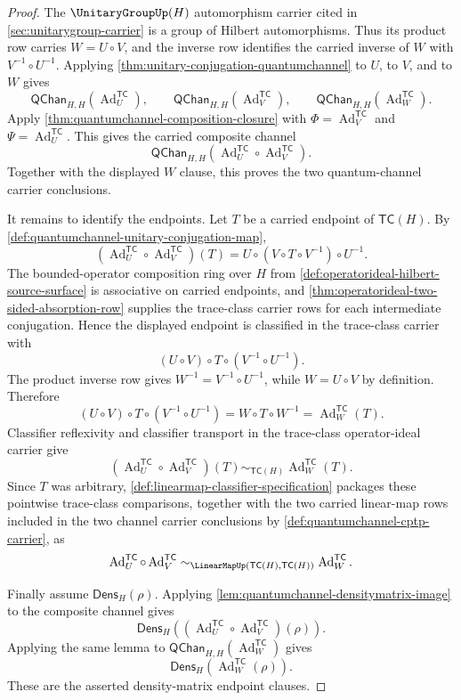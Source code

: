 \begin{proof}
The $\UnitaryGroupUp(H)$ automorphism carrier cited in \autoref{sec:unitarygroup-carrier} is a group of Hilbert automorphisms. Thus its product row carries $W=U\circ V$, and the inverse row identifies the carried inverse of $W$ with $V^{-1}\circ U^{-1}$. Applying \autoref{thm:unitary-conjugation-quantumchannel} to $U$, to $V$, and to $W$ gives
$$
\mathsf{QChan}_{H,H}(\operatorname{Ad}^{\mathsf{TC}}_U),
\qquad
\mathsf{QChan}_{H,H}(\operatorname{Ad}^{\mathsf{TC}}_V),
\qquad
\mathsf{QChan}_{H,H}(\operatorname{Ad}^{\mathsf{TC}}_{W}).
$$
Apply \autoref{thm:quantumchannel-composition-closure} with $\Phi=\operatorname{Ad}^{\mathsf{TC}}_V$ and $\Psi=\operatorname{Ad}^{\mathsf{TC}}_U$. This gives the carried composite channel
$$
\mathsf{QChan}_{H,H}(\operatorname{Ad}^{\mathsf{TC}}_U\circ\operatorname{Ad}^{\mathsf{TC}}_V).
$$
Together with the displayed $W$ clause, this proves the two quantum-channel carrier conclusions.

It remains to identify the endpoints. Let $T$ be a carried endpoint of $\mathsf{TC}(H)$. By \autoref{def:quantumchannel-unitary-conjugation-map},
$$
(\operatorname{Ad}^{\mathsf{TC}}_U\circ\operatorname{Ad}^{\mathsf{TC}}_V)(T)
=
U\circ (V\circ T\circ V^{-1})\circ U^{-1}.
$$
The bounded-operator composition ring over $H$ from \autoref{def:operatorideal-hilbert-source-surface} is associative on carried endpoints, and \autoref{thm:operatorideal-two-sided-absorption-row} supplies the trace-class carrier rows for each intermediate conjugation. Hence the displayed endpoint is classified in the trace-class carrier with
$$
(U\circ V)\circ T\circ (V^{-1}\circ U^{-1}).
$$
The product inverse row gives $W^{-1}=V^{-1}\circ U^{-1}$, while $W=U\circ V$ by definition. Therefore
$$
(U\circ V)\circ T\circ (V^{-1}\circ U^{-1})
=
W\circ T\circ W^{-1}
=
\operatorname{Ad}^{\mathsf{TC}}_{W}(T).
$$
Classifier reflexivity and classifier transport in the trace-class operator-ideal carrier give
$$
(\operatorname{Ad}^{\mathsf{TC}}_U\circ\operatorname{Ad}^{\mathsf{TC}}_V)(T)
\sim_{\mathsf{TC}(H)}
\operatorname{Ad}^{\mathsf{TC}}_{W}(T).
$$
Since $T$ was arbitrary, \autoref{def:linearmap-classifier-specification} packages these pointwise trace-class comparisons, together with the two carried linear-map rows included in the two channel carrier conclusions by \autoref{def:quantumchannel-cptp-carrier}, as
$$
\operatorname{Ad}^{\mathsf{TC}}_U\circ\operatorname{Ad}^{\mathsf{TC}}_V
\sim_{\LinearMapUp(\mathsf{TC}(H),\mathsf{TC}(H))}
\operatorname{Ad}^{\mathsf{TC}}_{W}.
$$

Finally assume $\mathsf{Dens}_H(\rho)$. Applying \autoref{lem:quantumchannel-densitymatrix-image} to the composite channel gives
$$
\mathsf{Dens}_H((\operatorname{Ad}^{\mathsf{TC}}_U\circ\operatorname{Ad}^{\mathsf{TC}}_V)(\rho)).
$$
Applying the same lemma to $\mathsf{QChan}_{H,H}(\operatorname{Ad}^{\mathsf{TC}}_{W})$ gives
$$
\mathsf{Dens}_H(\operatorname{Ad}^{\mathsf{TC}}_{W}(\rho)).
$$
These are the asserted density-matrix endpoint clauses.
\end{proof}

